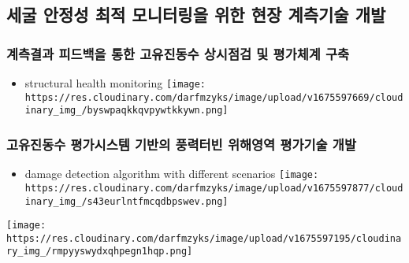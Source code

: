 \documentclass[
  letterpaper,
  DIV=11,
  numbers=noendperiod]{scrreprt}
\providecommand{\tightlist}{%
  \setlength{\itemsep}{0pt}\setlength{\parskip}{0pt}}\usepackage{longtable,booktabs,array}
\begin{document}
\hypertarget{uxc138uxad74-uxc548uxc815uxc131-uxcd5cuxc801-uxbaa8uxb2c8uxd130uxb9c1uxc744-uxc704uxd55c-uxd604uxc7a5-uxacc4uxce21uxae30uxc220-uxac1cuxbc1c}{%
\subsection{세굴 안정성 최적 모니터링을 위한 현장 계측기술
개발}\label{uxc138uxad74-uxc548uxc815uxc131-uxcd5cuxc801-uxbaa8uxb2c8uxd130uxb9c1uxc744-uxc704uxd55c-uxd604uxc7a5-uxacc4uxce21uxae30uxc220-uxac1cuxbc1c}}

\hypertarget{uxacc4uxce21uxacb0uxacfc-uxd53cuxb4dcuxbc31uxc744-uxd1b5uxd55c-uxace0uxc720uxc9c4uxb3d9uxc218-uxc0c1uxc2dcuxc810uxac80-uxbc0f-uxd3c9uxac00uxccb4uxacc4-uxad6cuxcd95}{%
\subsubsection{계측결과 피드백을 통한 고유진동수 상시점검 및 평가체계
구축}\label{uxacc4uxce21uxacb0uxacfc-uxd53cuxb4dcuxbc31uxc744-uxd1b5uxd55c-uxace0uxc720uxc9c4uxb3d9uxc218-uxc0c1uxc2dcuxc810uxac80-uxbc0f-uxd3c9uxac00uxccb4uxacc4-uxad6cuxcd95}}

\begin{itemize}
\tightlist
\item
  structural health monitoring
  \texttt{[image: https://res.cloudinary.com/darfmzyks/image/upload/v1675597669/cloudinary\_img\_/byswpaqkkqvpywtkkywn.png]}
\end{itemize}

\hypertarget{uxace0uxc720uxc9c4uxb3d9uxc218-uxd3c9uxac00uxc2dcuxc2a4uxd15c-uxae30uxbc18uxc758-uxd48duxb825uxd130uxbe48-uxc704uxd574uxc601uxc5ed-uxd3c9uxac00uxae30uxc220-uxac1cuxbc1c}{%
\subsubsection{고유진동수 평가시스템 기반의 풍력터빈 위해영역 평가기술
개발}\label{uxace0uxc720uxc9c4uxb3d9uxc218-uxd3c9uxac00uxc2dcuxc2a4uxd15c-uxae30uxbc18uxc758-uxd48duxb825uxd130uxbe48-uxc704uxd574uxc601uxc5ed-uxd3c9uxac00uxae30uxc220-uxac1cuxbc1c}}

\begin{itemize}
\tightlist
\item
  damage detection algorithm with different scenarios
  \texttt{[image: https://res.cloudinary.com/darfmzyks/image/upload/v1675597877/cloudinary\_img\_/s43eurlntfmcqdbpswev.png]}
\end{itemize}

\texttt{[image: https://res.cloudinary.com/darfmzyks/image/upload/v1675597195/cloudinary\_img\_/rmpyyswydxqhpegn1hqp.png]}
\end{document}
